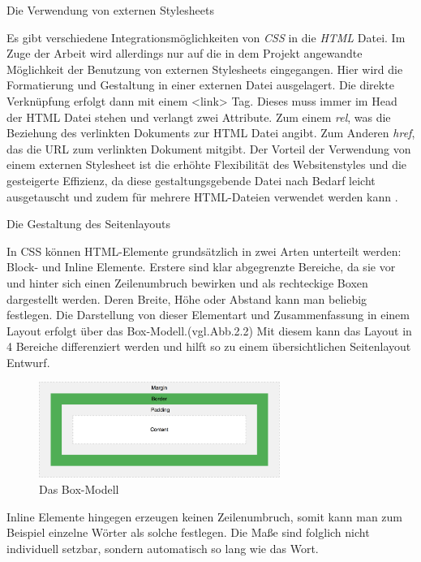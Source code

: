 \begin{description}
	\item[Die Verwendung von externen Stylesheets]
    \hfill
    \label{des:Aufbau_CSS}
\end{description}
%
Es gibt verschiedene Integrationsmöglichkeiten von \textit{CSS} in die \textit{HTML} Datei. Im Zuge der Arbeit wird allerdings nur auf die in dem Projekt angewandte Möglichkeit der Benutzung von externen Stylesheets eingegangen. Hier wird die Formatierung und Gestaltung in einer externen Datei ausgelagert. Die direkte Verknüpfung erfolgt dann mit einem <link> Tag. Dieses muss immer im Head der \ac{HTML} Datei stehen und verlangt zwei Attribute. Zum einem \textit{rel}, was die Beziehung des verlinkten Dokuments zur \ac{HTML} Datei angibt. Zum Anderen \textit{href}, das die URL zum verlinkten Dokument mitgibt. Der Vorteil der Verwendung von einem externen Stylesheet ist die erhöhte Flexibilität des Websitenstyles und die gesteigerte Effizienz, da diese gestaltungsgebende Datei nach Bedarf leicht ausgetauscht und zudem für mehrere \ac{HTML}-Dateien verwendet werden kann \cite{kaskade}.





\begin{description}
	\item[Die Gestaltung des Seitenlayouts]
	\hfill 
    \label{des:Layout_CSS}
\end{description}
%
In \ac{CSS} können \ac{HTML}-Elemente grundsätzlich in zwei Arten unterteilt werden: Block- und Inline Elemente. Erstere sind klar abgegrenzte Bereiche, da sie vor und hinter sich einen Zeilenumbruch bewirken und als rechteckige Boxen dargestellt werden. Deren Breite, Höhe oder Abstand kann man beliebig festlegen. Die Darstellung von dieser Elementart und Zusammenfassung in einem Layout erfolgt über das Box-Modell.(vgl.Abb.2.2) Mit diesem kann das Layout in 4 Bereiche differenziert werden und hilft so zu einem übersichtlichen Seitenlayout Entwurf. 
%
\begin{figure}
  \centering
  \includegraphics[width=0.7\textwidth]{imports/boxmodell.png}
  \caption{Das Box-Modell \cite{boxmodell}}
\end{figure}
%
Inline Elemente hingegen erzeugen keinen Zeilenumbruch, somit kann man zum Beispiel einzelne Wörter als solche festlegen. Die Maße sind folglich nicht individuell setzbar, sondern automatisch so lang wie das Wort. 










